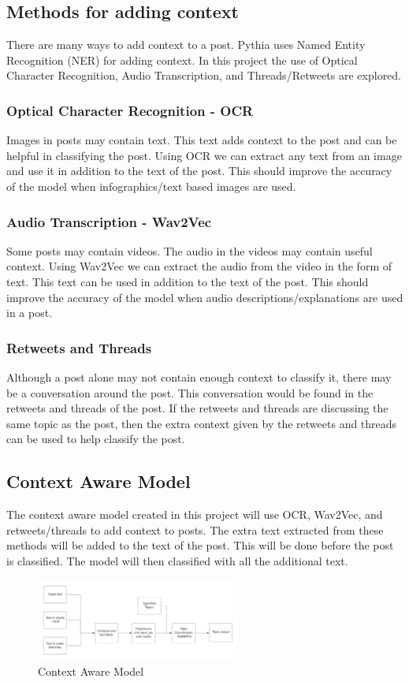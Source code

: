 \subsection{Methods for adding context}
There are many ways to add context to a post. Pythia uses Named Entity Recognition (NER) for adding context. In this project the use
of Optical Character Recognition, Audio Transcription, and Threads/Retweets are explored.
\subsubsection{Optical Character Recognition - OCR}
Images in posts may contain text. This text adds context to the post and can be helpful in classifying the post.
Using OCR we can extract any text from an image and use it in addition to the text of the post. This should improve the accuracy of the
model when infographics/text based images are used.
\subsubsection{Audio Transcription - Wav2Vec}
Some posts may contain videos. The audio in the videos may contain useful context. Using Wav2Vec we can extract the audio from the video
in the form of text. This text can be used in addition to the text of the post. This should improve the accuracy of the model when audio
descriptions/explanations are used in a post.
\subsubsection{Retweets and Threads}
Although a post alone may not contain enough context to classify it, there may be a conversation around the post. This conversation 
would be found in the retweets and threads of the post. If the retweets and threads are discussing the same topic as the post, then the
extra context given by the retweets and threads can be used to help classify the post.

\subsection{Context Aware Model}
The context aware model created in this project will use OCR, Wav2Vec, and retweets/threads to add context to posts. The extra text
extracted from these methods will be added to the text of the post. This will be done before the post is classified. The model will then
classified with all the additional text.
\begin{figure}[hbtp]
    \centering
    \includegraphics[width=0.6\textwidth]{../images/context-aware-model.png}
    \caption{Context Aware Model}
    \label{fig:context-aware-model}
\end{figure}

